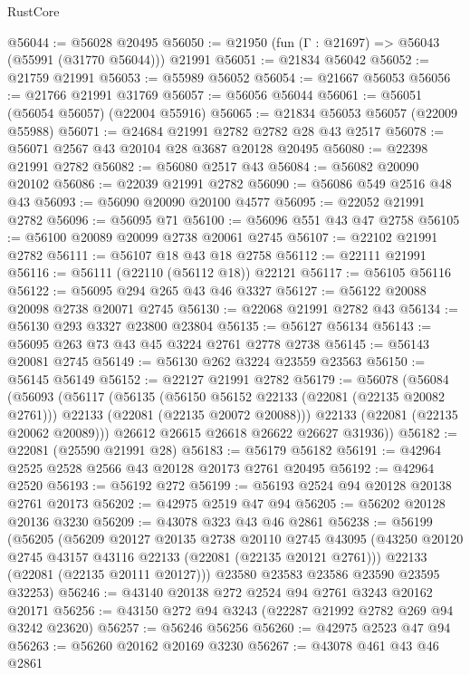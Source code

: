 \begin{lexlean}{RustCore}
\begin{coremodule}
@56044 := @56028 @20495
@56050 := @21950 (fun (Γ : @21697) => @56043 (@55991 (@31770 @56044))) @21991
@56051 := @21834 @56042
@56052 := @21759 @21991
@56053 := @55989 @56052
@56054 := @21667 @56053
@56056 := @21766 @21991 @31769
@56057 := @56056 @56044
@56061 := @56051 (@56054 @56057) (@22004 @55916)
@56065 := @21834 @56053 @56057 (@22009 @55988)
@56071 := @24684 @21991 @2782 @2782 @28 @43 @2517
@56078 := @56071 @2567 @43 @20104 @28 @3687 @20128 @20495
@56080 := @22398 @21991 @2782
@56082 := @56080 @2517 @43
@56084 := @56082 @20090 @20102
@56086 := @22039 @21991 @2782
@56090 := @56086 @549 @2516 @48 @43
@56093 := @56090 @20090 @20100 @4577
@56095 := @22052 @21991 @2782
@56096 := @56095 @71
@56100 := @56096 @551 @43 @47 @2758
@56105 := @56100 @20089 @20099 @2738 @20061 @2745
@56107 := @22102 @21991 @2782
@56111 := @56107 @18 @43 @18 @2758
@56112 := @22111 @21991
@56116 := @56111 (@22110 (@56112 @18)) @22121
@56117 := @56105 @56116
@56122 := @56095 @294 @265 @43 @46 @3327
@56127 := @56122 @20088 @20098 @2738 @20071 @2745
@56130 := @22068 @21991 @2782 @43
@56134 := @56130 @293 @3327 @23800 @23804
@56135 := @56127 @56134
@56143 := @56095 @263 @73 @43 @45 @3224 @2761 @2778 @2738
@56145 := @56143 @20081 @2745
@56149 := @56130 @262 @3224 @23559 @23563
@56150 := @56145 @56149
@56152 := @22127 @21991 @2782
@56179 := @56078
    (@56084
      (@56093
        (@56117
          (@56135
            (@56150 @56152 @22133 (@22081 (@22135 @20082 @2761)))
            @22133
            (@22081 (@22135 @20072 @20088)))
          @22133
          (@22081 (@22135 @20062 @20089)))
        @26612
        @26615
        @26618
        @26622
        @26627
        @31936))
@56182 := @22081 (@25590 @21991 @28)
@56183 := @56179 @56182
@56191 := @42964 @2525 @2528 @2566 @43 @20128 @20173 @2761 @20495
@56192 := @42964 @2520
@56193 := @56192 @272
@56199 := @56193 @2524 @94 @20128 @20138 @2761 @20173
@56202 := @42975 @2519 @47 @94
@56205 := @56202 @20128 @20136 @3230
@56209 := @43078 @323 @43 @46 @2861
@56238 := @56199
    (@56205
      (@56209
        @20127
        @20135
        @2738
        @20110
        @2745
        @43095
        (@43250 @20120 @2745 @43157 @43116 @22133 (@22081 (@22135 @20121 @2761)))
        @22133
        (@22081 (@22135 @20111 @20127)))
      @23580
      @23583
      @23586
      @23590
      @23595
      @32253)
@56246 := @43140 @20138 @272 @2524 @94 @2761 @3243 @20162 @20171
@56256 := @43150 @272 @94 @3243 (@22287 @21992 @2782 @269 @94 @3242 @23620)
@56257 := @56246 @56256
@56260 := @42975 @2523 @47 @94
@56263 := @56260 @20162 @20169 @3230
@56267 := @43078 @461 @43 @46 @2861

\end{coremodule}
\end{lexlean}
